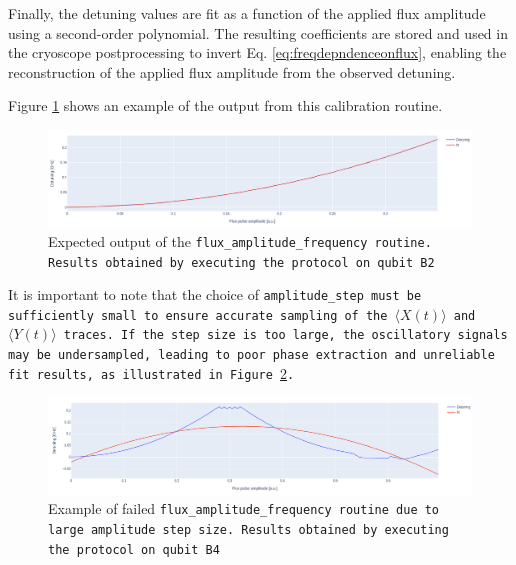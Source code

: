 Finally, the detuning values are fit as a function of the applied flux amplitude using a second-order polynomial.
The resulting coefficients are stored and used in the cryoscope postprocessing to invert Eq. \ref{eq:freqdepndenceonflux}, enabling the reconstruction of the applied flux amplitude from the observed detuning.

Figure \ref{fig:flux_amplitude_frequency} shows an example of the output from this calibration routine.

\begin{figure}[h!]
    \centering
    \includegraphics[width=\textwidth]{figures/png/flux_amp_freq.png}
    \caption{Expected output of the \tt{flux\_amplitude\_frequency} routine. Results obtained by executing the protocol on qubit \tt{B2}}
    \label{fig:flux_amplitude_frequency}
\end{figure}

It is important to note that the choice of \tt{amplitude\_step} must be sufficiently small to ensure accurate sampling of the $\langle X(t) \rangle$ and $\langle Y(t) \rangle$ traces. 
If the step size is too large, the oscillatory signals may be undersampled, leading to poor phase extraction and unreliable fit results, as illustrated in Figure \ref{fig:bad_sampling}.

\begin{figure}[h!]
    \centering
    \includegraphics[width=\textwidth]{figures/png/low_sampling.png}
    \caption{Example of failed \tt{flux\_amplitude\_frequency} routine due to large amplitude step size. Results obtained by executing the protocol on qubit \tt{B4}}
    \label{fig:bad_sampling}
\end{figure}